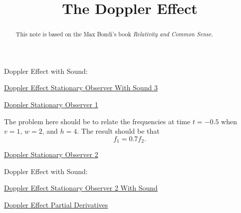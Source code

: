 \documentclass{ximera}
\title{The Doppler Effect}
\begin{document}
\begin{abstract}
This note is based on the Max Bondi's book \emph{Relativity and Common Sense}.
\end{abstract}
\maketitle


Doppler Effect with Sound:

\begin{onlineOnly}
    \begin{center}
\end{center}
\end{onlineOnly}

\href{https://www.desmos.com/calculator/t1jmkomfwd}{Doppler Effect Stationary Observer With Sound 3}



\begin{onlineOnly}
    \begin{center}
\end{center}
\end{onlineOnly}

\href{https://www.desmos.com/calculator/zk06s3k6q4}{Doppler Stationary Observer 1}


The problem here should be to relate the frequencies at time $t=-0.5$ when $v=1$, $w=2$, and $h=4$. The result should be that 
\[
    f_1 = 0.7 f_2 . 
\]





\begin{onlineOnly}
    \begin{center}
\end{center}
\end{onlineOnly}

\href{https://www.desmos.com/calculator/celviaogz7}{Doppler Stationary Observer 2}

Doppler Effect with Sound:

\begin{onlineOnly}
    \begin{center}
\end{center}
\end{onlineOnly}

\href{https://www.desmos.com/calculator/gxzmjpgkrr}{Doppler Effect Stationary Observer 2 With Sound}

\begin{onlineOnly}
    \begin{center}
\end{center}
\end{onlineOnly}

\href{https://www.desmos.com/calculator/sf3nnahyjf}{Doppler Effect Partial Derivatives}
\end{document}
